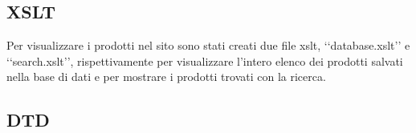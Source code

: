 {	\subsection{XSLT}
	Per visualizzare i prodotti nel sito sono stati creati due file xslt, ‘‘database.xslt’’ e ‘‘search.xslt’’, rispettivamente per visualizzare l'intero elenco dei prodotti salvati nella base di dati e per mostrare i prodotti trovati con la ricerca.
	\subsection{DTD}
}